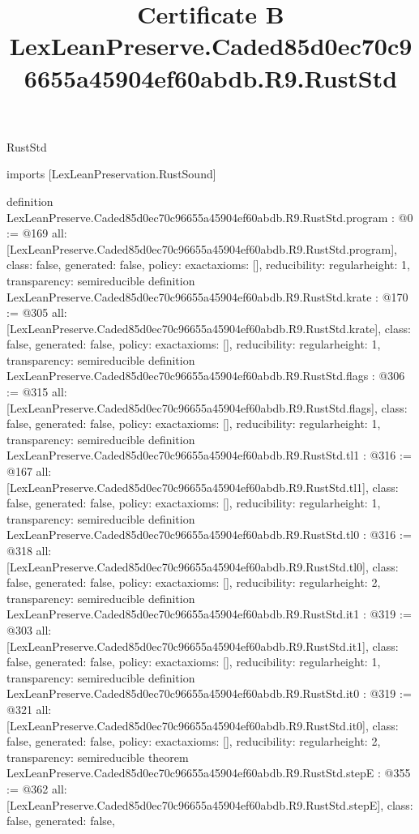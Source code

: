 \begin{lexlean}{RustStd}
\title{Certificate B LexLeanPreserve.Caded85d0ec70c96655a45904ef60abdb.R9.RustStd}
\begin{coremodule}
imports [LexLeanPreservation.RustSound]

definition LexLeanPreserve.Caded85d0ec70c96655a45904ef60abdb.R9.RustStd.program : @0 := @169 {
  all: [LexLeanPreserve.Caded85d0ec70c96655a45904ef60abdb.R9.RustStd.program],
  class: false,
  generated: false,
  policy: exact{axioms: []},
  reducibility: regular{height: 1},
  transparency: semireducible
}
definition LexLeanPreserve.Caded85d0ec70c96655a45904ef60abdb.R9.RustStd.krate : @170 := @305 {
  all: [LexLeanPreserve.Caded85d0ec70c96655a45904ef60abdb.R9.RustStd.krate],
  class: false,
  generated: false,
  policy: exact{axioms: []},
  reducibility: regular{height: 1},
  transparency: semireducible
}
definition LexLeanPreserve.Caded85d0ec70c96655a45904ef60abdb.R9.RustStd.flags : @306 := @315 {
  all: [LexLeanPreserve.Caded85d0ec70c96655a45904ef60abdb.R9.RustStd.flags],
  class: false,
  generated: false,
  policy: exact{axioms: []},
  reducibility: regular{height: 1},
  transparency: semireducible
}
definition LexLeanPreserve.Caded85d0ec70c96655a45904ef60abdb.R9.RustStd.tl1 : @316 := @167 {
  all: [LexLeanPreserve.Caded85d0ec70c96655a45904ef60abdb.R9.RustStd.tl1],
  class: false,
  generated: false,
  policy: exact{axioms: []},
  reducibility: regular{height: 1},
  transparency: semireducible
}
definition LexLeanPreserve.Caded85d0ec70c96655a45904ef60abdb.R9.RustStd.tl0 : @316 := @318 {
  all: [LexLeanPreserve.Caded85d0ec70c96655a45904ef60abdb.R9.RustStd.tl0],
  class: false,
  generated: false,
  policy: exact{axioms: []},
  reducibility: regular{height: 2},
  transparency: semireducible
}
definition LexLeanPreserve.Caded85d0ec70c96655a45904ef60abdb.R9.RustStd.it1 : @319 := @303 {
  all: [LexLeanPreserve.Caded85d0ec70c96655a45904ef60abdb.R9.RustStd.it1],
  class: false,
  generated: false,
  policy: exact{axioms: []},
  reducibility: regular{height: 1},
  transparency: semireducible
}
definition LexLeanPreserve.Caded85d0ec70c96655a45904ef60abdb.R9.RustStd.it0 : @319 := @321 {
  all: [LexLeanPreserve.Caded85d0ec70c96655a45904ef60abdb.R9.RustStd.it0],
  class: false,
  generated: false,
  policy: exact{axioms: []},
  reducibility: regular{height: 2},
  transparency: semireducible
}
theorem LexLeanPreserve.Caded85d0ec70c96655a45904ef60abdb.R9.RustStd.stepE : @355 := @362 {
  all: [LexLeanPreserve.Caded85d0ec70c96655a45904ef60abdb.R9.RustStd.stepE],
  class: false,
  generated: false,
}
\end{coremodule}
\end{lexlean}

